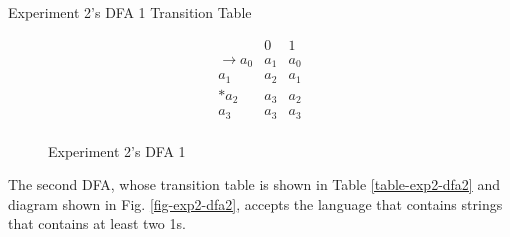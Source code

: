 \documentclass[conference]{IEEEtran}
\begin{document}
\begin{table}[h!]
    \caption{Experiment 2's DFA 1 Transition Table}
    \begin{displaymath}
        \begin{array}{r|c|c|}
        & 0 & 1 \\
        \hline
        \rightarrow a_0 & a_1 & a_0 \\
        a_1 & a_2 & a_1 \\
        * a_2 & a_3 & a_2 \\
        a_3 & a_3 & a_3 \\
        \end{array}
    \end{displaymath}
    \label{table-exp2-dfa1}
\end{table}
\begin{figure}[h!]
    \centering
    \caption{Experiment 2's DFA 1}
    \label{fig-exp2-dfa1}
\end{figure}

The second DFA, whose transition table is shown in Table \ref{table-exp2-dfa2} and diagram shown in Fig. \ref{fig-exp2-dfa2}, accepts the language that contains strings that contains at least two 1s.
\end{document}
